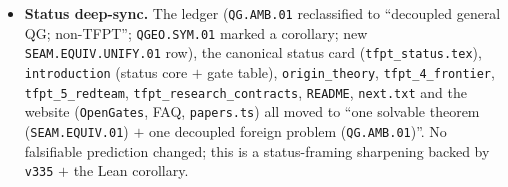 \documentclass[11pt]{article}
\begin{document}
\begin{itemize}
$+$ cited BW/net axioms). \texttt{lake build} green (3362 jobs).
\item \textbf{Status deep-sync.} The ledger (\texttt{QG.AMB.01} reclassified to ``decoupled general QG; non-TFPT'';
\texttt{QGEO.SYM.01} marked a corollary; new \texttt{SEAM.EQUIV.UNIFY.01} row), the canonical status card
(\texttt{tfpt\_status.tex}), \texttt{introduction} (status core $+$ gate table), \texttt{origin\_theory},
\texttt{tfpt\_4\_frontier}, \texttt{tfpt\_5\_redteam}, \texttt{tfpt\_research\_contracts}, \texttt{README},
\texttt{next.txt} and the website (\texttt{OpenGates}, FAQ, \texttt{papers.ts}) all moved to ``one solvable theorem
(\texttt{SEAM.EQUIV.01}) $+$ one decoupled foreign problem (\texttt{QG.AMB.01})''. No falsifiable prediction
changed; this is a status-framing sharpening backed by \texttt{v335} $+$ the Lean corollary.
\end{itemize}
\end{document}
